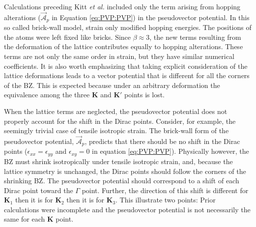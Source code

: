 Calculations preceding Kitt \textit{et al.} \cite{Kitt2012} included only the term arising from hopping alterations ($\vec{\mathcal{A}}_p$ in Equation \ref{eq:PVP:PVP}) in the pseudovector potential.
In this so called brick-wall model, strain only modified hopping energies.
The positions of the atoms were left fixed like bricks.
Since $\beta \approx 3$, the new terms resulting from the deformation of the lattice contributes equally to hopping alterations.
These terms are not only the same order in strain, but they have similar numerical coefficients.
It is also worth emphasizing that taking explicit consideration of the lattice deformations leads to a vector potential that is different for all the corners of the BZ.
This is expected because under an arbitrary deformation the equivalence among the three $\bm{K}$ and $\bm{K'}$ points is lost.

When the lattice terms are neglected, the pseudovector potential does not properly account for the shift in the Dirac points.
Consider, for example, the seemingly trivial case of tensile isotropic strain.
The brick-wall form of the pseudovector potential, $\vec{\mathcal{A}}_p$, predicts that there should be no shift in the Dirac points ($\epsilon_{xx}=\epsilon_{yy}$ and $\epsilon_{xy}=0$ in equation \ref{eq:PVP:PVP}).
Physically however, the BZ must shrink isotropically under tensile isotropic strain, and, because the lattice symmetry is unchanged, the Dirac points should follow the corners of the shrinking BZ.
The pseudovector potential should correspond to a shift of each Dirac point toward the $\Gamma$ point.
Further, the direction of this shift is different for $\bm{K}_1$ then it is for $\bm{K}_2$ then it is for $\bm{K}_3$. 
This illustrate two points: Prior calculations were incomplete and the pseudovector potential is not necessarily the same for each $\bm{K}$ point.


